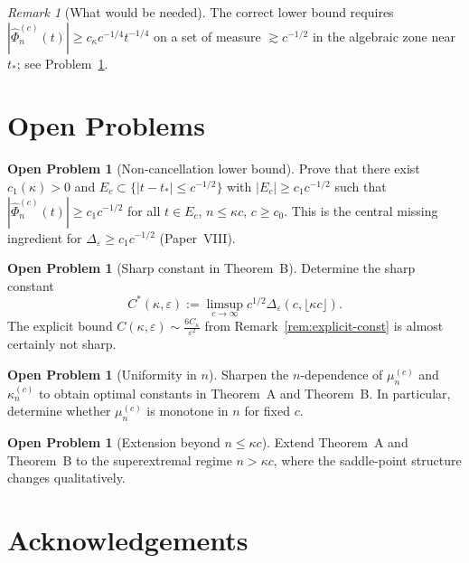\documentclass[12pt,a4paper]{amsart}
\theoremstyle{definition}
\newtheorem{problem}[theorem]{Open Problem}
\theoremstyle{remark}
\newtheorem{remark}[theorem]{Remark}
\newcommand{\tstar}{t_*}
\begin{document}
\begin{remark}[What would be needed]
\label{rem:lower-needed}
The correct lower bound requires
$|\widehat{\Phi}_n^{(c)}(t)| \ge c_\kappa c^{-1/4}t^{-1/4}$
on a set of measure $\gtrsim c^{-1/2}$
in the algebraic zone near $\tstar$;
see Problem~\ref{prob:nonvanish}.
\end{remark}

\section{Open Problems}
\label{sec:problems}

\begin{problem}[Non-cancellation lower bound]
\label{prob:nonvanish}
Prove that there exist $c_1(\kappa)>0$
and $E_c \subset \{|t-\tstar|\le c^{-1/2}\}$
with $|E_c| \ge c_1 c^{-1/2}$ such that
$|\widehat{\Phi}_n^{(c)}(t)| \ge c_1 c^{-1/2}$
for all $t\in E_c$, $n\le\kappa c$, $c\ge c_0$.
This is the central missing ingredient for
$\Delta_\varepsilon \ge c_1 c^{-1/2}$
(Paper~VIII).
\end{problem}

\begin{problem}[Sharp constant in Theorem~B]
\label{prob:sharp-const}
Determine the sharp constant
\[
C^*(\kappa,\varepsilon)
:= \limsup_{c\to\infty}
c^{1/2}\Delta_\varepsilon(c,\lfloor\kappa c\rfloor).
\]
The explicit bound $C(\kappa,\varepsilon)
\sim \frac{6C_\kappa}{\varepsilon^2}$
from Remark~\ref{rem:explicit-const}
is almost certainly not sharp.
\end{problem}

\begin{problem}[Uniformity in $n$]
\label{prob:uniformity}
Sharpen the $n$-dependence of
$\mu_n^{(c)}$ and $\kappa_n^{(c)}$
to obtain optimal constants in
Theorem~A and Theorem~B.
In particular, determine whether
$\mu_n^{(c)}$ is monotone in $n$
for fixed $c$.
\end{problem}

\begin{problem}[Extension beyond $n \le \kappa c$]
\label{prob:extension}
Extend Theorem~A and Theorem~B to the
superextremal regime $n > \kappa c$,
where the saddle-point structure changes
qualitatively.
\end{problem}

\section*{Acknowledgements}
\end{document}
